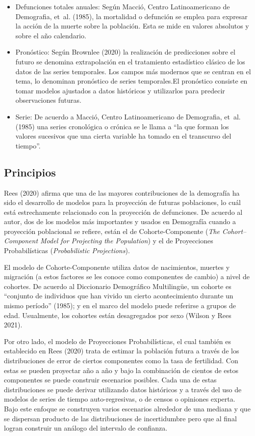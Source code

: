 \documentclass[
  letterpaper,
  onepage,
  openany]{report}
\begin{document}
\begin{itemize}
\item
  Defunciones totales anuales: Según Macció, Centro Latinoamericano de
  Demografia, et~al. (1985), la mortalidad o defunción se emplea para
  expresar la acción de la muerte sobre la población. Esta se mide en
  valores absolutos y sobre el año calendario.
\item
  Pronóstico: Según Brownlee (2020) la realización de predicciones sobre
  el futuro se denomina extrapolación en el tratamiento estadístico
  clásico de los datos de las series temporales. Los campos más modernos
  que se centran en el tema, lo denominan pronóstico de series
  temporales.El pronóstico consiste en tomar modelos ajustados a datos
  históricos y utilizarlos para predecir observaciones futuras.
\item
  Serie: De acuerdo a Macció, Centro Latinoamericano de Demografia,
  et~al. (1985) una series cronológica o crónica se le llama a ``la que
  forman los valores sucesivos que una cierta variable ha tomado en el
  transcurso del tiempo''.
\end{itemize}

\hypertarget{principios}{%
\subsection{Principios}\label{principios}}

Rees (2020) afirma que una de las mayores contribuciones de la
demografía ha sido el desarrollo de modelos para la proyección de
futuras poblaciones, lo cuál está estrechamente relacionado con la
proyección de defunciones. De acuerdo al autor, dos de los modelos más
importantes y usados en Demografía cuando a proyección poblacional se
refiere, están el de Cohorte-Componente (\emph{The Cohort--Component
Model for Projecting the Population}) y el de Proyecciones
Probabilísticas (\emph{Probabilistic Projections}).

El modelo de Cohorte-Componente utiliza datos de nacimientos, muertes y
migración (a estos factores se les conoce como componentes de cambio) a
nivel de cohortes. De acuerdo al Diccionario Demográfico Multilingüe, un
cohorte es ``conjunto de individuos que han vivido un cierto
acontecimiento durante un mismo período'' (1985); y en el marco del
modelo puede referirse a grupos de edad. Usualmente, los cohortes están
desagregados por sexo (Wilson y Rees 2021).

Por otro lado, el modelo de Proyecciones Probabilísticas, el cual
también es establecido en Rees (2020) trata de estimar la población
futura a través de los distribuciones de error de ciertos componentes
como la tasa de fertilidad. Con estas se pueden proyectar año a año y
bajo la combinación de cientos de estos componentes se puede construir
escenarios posibles. Cada una de estas distribuciones se puede derivar
utilizando datos históricos y a través del uso de modelos de series de
tiempo auto-regresivas, o de censos o opiniones experta. Bajo este
enfoque se construyen varios escenarios alrededor de una mediana y que
se dispersan producto de las distribuciones de incertidumbre pero que al
final logran construir un análogo del intervalo de confianza.
\end{document}
